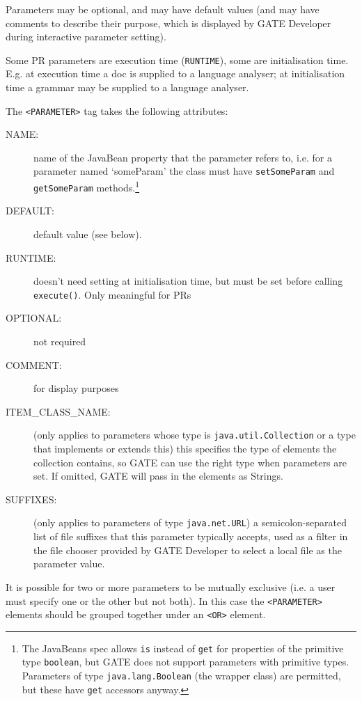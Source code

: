 Parameters may be optional, and may have default values (and may have
comments to describe their purpose, which is displayed by GATE
Developer during interactive parameter setting).

Some PR parameters are execution time ({\tt RUNTIME}),
some are initialisation time.
E.g. at execution time a doc is supplied to a language analyser;
at initialisation time a grammar may be supplied to a language analyser.

The \verb|<PARAMETER>| tag takes the following attributes:
\begin{description}
\item[NAME:]
name of the JavaBean property that the parameter refers to, i.e. for a
parameter named `someParam' the class must have {\tt setSomeParam} and
{\tt getSomeParam} methods.\footnote{The JavaBeans spec allows {\tt is} instead
of {\tt get} for properties of the primitive type {\tt boolean}, but GATE does
not support parameters with primitive types.  Parameters of type
{\tt java.lang.Boolean} (the wrapper class) are permitted, but these have
{\tt get} accessors anyway.}
\item[DEFAULT:]
default value (see below).
\item[RUNTIME:]
doesn't need setting at initialisation time, but must be set before calling
{\tt execute()}. Only meaningful for PRs
\item[OPTIONAL:]
not required
\item[COMMENT:]
for display purposes
\item[ITEM\_CLASS\_NAME:]
(only applies to parameters whose type is {\tt java.util.Collection}
or a type that implements or extends this) this specifies the type of
elements the collection contains, so GATE can use the right
type when parameters are set.  If omitted, GATE will pass in
the elements as Strings.
\item[SUFFIXES:]
(only applies to parameters of type {\tt java.net.URL}) a
semicolon-separated list of file suffixes that this parameter
typically accepts, used as a filter in the file chooser provided by
GATE Developer to select a local file as the parameter value.
\end{description}

It is possible for two or more parameters to be mutually exclusive (i.e. a user
must specify one or the other but not both).  In this case the
\verb|<PARAMETER>| elements should be grouped together under an \verb|<OR>|
element.

